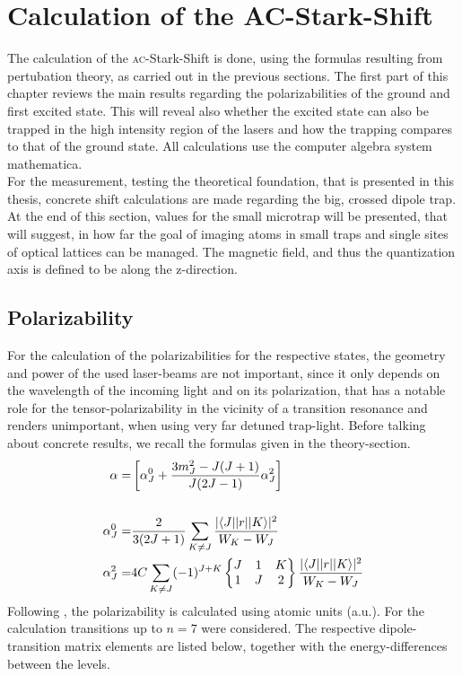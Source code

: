 \chapter{Calculation of the AC-Stark-Shift}

The calculation of the \textsc{ac}-Stark-Shift is done, using the formulas resulting from pertubation theory, as carried out in the previous sections. The first part of this chapter reviews the main results regarding the polarizabilities of the ground and first excited state. This will reveal also whether the excited state can also be trapped in the high intensity region of the lasers and how the trapping compares to that of the ground state. All calculations use the computer algebra system mathematica.\\For the measurement, testing the theoretical foundation, that is presented in this thesis, concrete shift calculations are made regarding the big, crossed dipole trap. At the end of this section, values for the small microtrap will be presented, that will suggest, in how far the goal of imaging atoms in small traps and single sites of optical lattices can be managed. The magnetic field, and thus the quantization axis is defined to be along the z-direction.

\section{Polarizability}
For the calculation of the polarizabilities for the respective states, the geometry and power of the used laser-beams are not important, since it only depends on the wavelength of the incoming light and on its polarization, that has a notable role for the tensor-polarizability in the vicinity of a transition resonance and renders unimportant, when using very far detuned trap-light. Before talking about concrete results, we recall the formulas given in the theory-section. 
\begin{align}
\alpha=&\left[\alpha^0_J+\frac{3m^2_J-J(J+1)}{J(2J-1)}\alpha^2_J\right]\\
\notag\\
\alpha^0_J=&\frac{2}{3(2J+1)}\sum_{K\neq J}\frac{|\langle J| |r| | K\rangle|^2}{W_K-W_J}\notag\\
\alpha^2_J=&4C\sum_{K\neq J}(-1)^{J+K}\begin{Bmatrix}J&1&K\\1&J&2\end{Bmatrix}\frac{|\langle J| |r| | K\rangle|^2}{W_K-W_J}\notag
\end{align}
Following \cite{magic01}, the polarizability is calculated using atomic units (a.u.). For the calculation transitions up to $n=7$ were considered. The respective dipole-transition matrix elements are listed below, together with the energy-differences between the levels.

